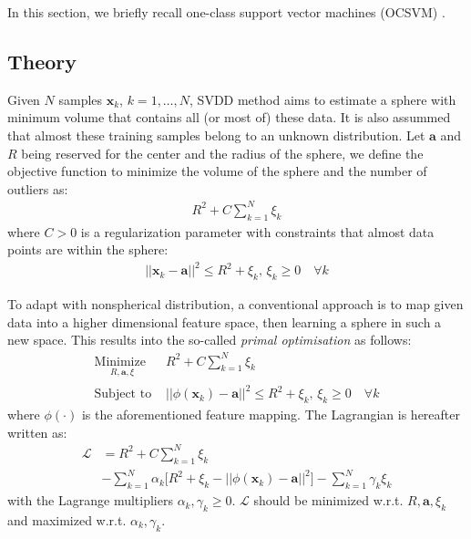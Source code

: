 \documentclass[conference]{IEEEtran}
\theoremstyle{problemstyle}
\begin{document}
In this section, we briefly recall one-class support vector machines (OCSVM) \cite{scholkopf2001estimating}.

\subsection{Theory}

Given $N$ samples $\mathbf{x}_k$, $k=1,\dots,N$, SVDD method aims to estimate a sphere with minimum volume that contains all (or most of) these data. It is also assummed that almost these training samples belong to an unknown distribution. Let $\mathbf{a}$ and $R$ being reserved for the center and the radius of the sphere, we define the objective function to minimize the volume of the sphere and the number of outliers as:
\begin{align}
R^2 + C \sum_{k=1}^N \xi_k
\end{align}
where $C > 0$ is a regularization parameter with constraints that almost data points are within the sphere:
\begin{align}
\left|\left| \mathbf{x}_k - \mathbf{a} \right|\right|^2 \le R^2 + \xi_k \text{, } \xi_k \ge 0 \quad \forall k
\end{align}

To adapt with nonspherical distribution, a conventional approach is to map given data into a higher dimensional feature space, then learning a sphere in such a new space. This results into the so-called \emph{primal optimisation} as follows:
\begin{subequations}\label{eq:svm_primal}
\begin{align}
\underset{
	\begin{array}{c}
		 R, \mathbf{a}, \xi
	\end{array}}{\text{Minimize }} &R^2 + C \sum_{k=1}^N \xi_k \\
\text{Subject to } &\left|\left| \phi \left( \mathbf{x}_k \right) - \mathbf{a}  \right|\right|^2 \le R^2 + \xi_k \text{, } \xi_k \ge 0 \quad \forall k
\end{align}
\end{subequations}
where $\phi \left( \cdot \right)$ is the aforementioned feature mapping. The Lagrangian is hereafter written as:
\begin{align}
\mathcal{L} &= R^2 + C \sum_{k=1}^N \xi_k \nonumber \\&- \sum_{k=1}^N \alpha_k \bigg[ R^2 + \xi_k - \left|\left| \phi \left( \mathbf{x}_k \right) - \mathbf{a} \right|\right|^2 \bigg] - \sum_{k=1}^N \gamma_k \xi_k \label{eq:svm_lagrange_init}
\end{align}
with the Lagrange multipliers $\alpha_k, \gamma_k \ge 0$. $\mathcal{L}$ should be minimized w.r.t. $R, \mathbf{a}, \xi_k$ and maximized w.r.t. $\alpha_k, \gamma_k$.
\end{document}
